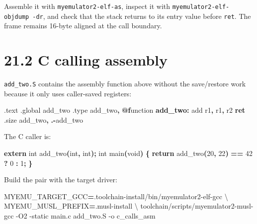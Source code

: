 \documentclass[
  oneside,
  openany]{book}
\newenvironment{Shaded}{\begin{snugshade}}{\end{snugshade}}
\newcommand{\AttributeTok}[1]{\textcolor[rgb]{0.13,0.29,0.53}{#1}}
\newcommand{\BuiltInTok}[1]{#1}
\newcommand{\ControlFlowTok}[1]{\textcolor[rgb]{0.13,0.29,0.53}{\textbf{#1}}}
\newcommand{\DataTypeTok}[1]{\textcolor[rgb]{0.13,0.29,0.53}{#1}}
\newcommand{\DecValTok}[1]{\textcolor[rgb]{0.00,0.00,0.81}{#1}}
\newcommand{\ExtensionTok}[1]{#1}
\newcommand{\FunctionTok}[1]{\textcolor[rgb]{0.13,0.29,0.53}{\textbf{#1}}}
\newcommand{\KeywordTok}[1]{\textcolor[rgb]{0.13,0.29,0.53}{\textbf{#1}}}
\newcommand{\NormalTok}[1]{#1}
\newcommand{\OperatorTok}[1]{\textcolor[rgb]{0.81,0.36,0.00}{\textbf{#1}}}
\newcommand{\VariableTok}[1]{\textcolor[rgb]{0.00,0.00,0.00}{#1}}
\begin{document}
Assemble it with \texttt{myemulator2-elf-as}, inspect it with
\texttt{myemulator2-elf-objdump\ -dr}, and check that the stack returns
to its entry value before \texttt{ret}. The frame remains 16-byte
aligned at the call boundary.

\hypertarget{c-calling-assembly}{%
\section{21.2 C calling assembly}\label{c-calling-assembly}}

\texttt{add\_two.S} contains the assembly function above without the
save/restore work because it only uses caller-saved registers:

\begin{Shaded}
\begin{Highlighting}[]
\NormalTok{.text}
\NormalTok{.global add\_two}
\NormalTok{.type add\_two}\OperatorTok{,} \FunctionTok{@f}\NormalTok{unction}
\FunctionTok{add\_two:}
        \BuiltInTok{add}\NormalTok{ r1}\OperatorTok{,}\NormalTok{ r1}\OperatorTok{,}\NormalTok{ r2}
        \ControlFlowTok{ret}
\NormalTok{.size add\_two}\OperatorTok{,} \OperatorTok{.{-}}\NormalTok{add\_two}
\end{Highlighting}
\end{Shaded}

The C caller is:

\begin{Shaded}
\begin{Highlighting}[]
\KeywordTok{extern} \DataTypeTok{int}\NormalTok{ add\_two}\OperatorTok{(}\DataTypeTok{int}\OperatorTok{,} \DataTypeTok{int}\OperatorTok{);}
\DataTypeTok{int}\NormalTok{ main}\OperatorTok{(}\DataTypeTok{void}\OperatorTok{)} \OperatorTok{\{} \ControlFlowTok{return}\NormalTok{ add\_two}\OperatorTok{(}\DecValTok{20}\OperatorTok{,} \DecValTok{22}\OperatorTok{)} \OperatorTok{==} \DecValTok{42} \OperatorTok{?} \DecValTok{0} \OperatorTok{:} \DecValTok{1}\OperatorTok{;} \OperatorTok{\}}
\end{Highlighting}
\end{Shaded}

Build the pair with the target driver:

\begin{Shaded}
\begin{Highlighting}[]
\VariableTok{MYEMU\_TARGET\_GCC}\OperatorTok{=}\NormalTok{.toolchain{-}install/bin/myemulator2{-}elf{-}gcc }\DataTypeTok{\textbackslash{}}
\VariableTok{MYEMU\_MUSL\_PREFIX}\OperatorTok{=}\NormalTok{.musl{-}install }\DataTypeTok{\textbackslash{}}
\ExtensionTok{toolchain/scripts/myemulator2{-}musl{-}gcc} \AttributeTok{{-}O2} \AttributeTok{{-}static}\NormalTok{ main.c add\_two.S }\AttributeTok{{-}o}\NormalTok{ c\_calls\_asm}
\end{Highlighting}
\end{Shaded}
\end{document}
